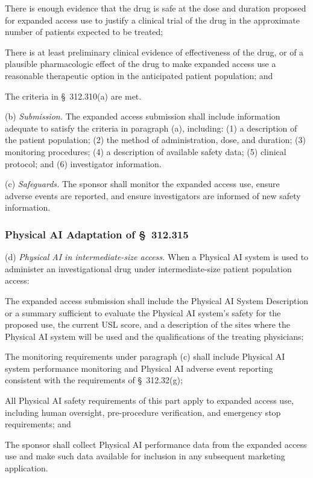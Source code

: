 \begin{description}[leftmargin=0.5cm,style=sameline]
\item[(1)] There is enough evidence that the drug is safe at the dose and duration proposed for expanded access use to justify a clinical trial of the drug in the approximate number of patients expected to be treated;
\item[(2)] There is at least preliminary clinical evidence of effectiveness of the drug, or of a plausible pharmacologic effect of the drug to make expanded access use a reasonable therapeutic option in the anticipated patient population; and
\item[(3)] The criteria in \S~312.310(a) are met.
\end{description}

(b) \textit{Submission.} The expanded access submission shall include information adequate to satisfy the criteria in paragraph (a), including: (1) a description of the patient population; (2) the method of administration, dose, and duration; (3) monitoring procedures; (4) a description of available safety data; (5) clinical protocol; and (6) investigator information.

(c) \textit{Safeguards.} The sponsor shall monitor the expanded access use, ensure adverse events are reported, and ensure investigators are informed of new safety information.

\subsubsection{Physical AI Adaptation of \S~312.315}

(d) \textit{Physical AI in intermediate-size access.} When a Physical AI system is used to administer an investigational drug under intermediate-size patient population access:

\begin{description}[leftmargin=0.8cm,style=sameline]
\item[(i)] The expanded access submission shall include the Physical AI System Description or a summary sufficient to evaluate the Physical AI system's safety for the proposed use, the current USL score, and a description of the sites where the Physical AI system will be used and the qualifications of the treating physicians;
\item[(ii)] The monitoring requirements under paragraph (c) shall include Physical AI system performance monitoring and Physical AI adverse event reporting consistent with the requirements of \S~312.32(g);
\item[(iii)] All Physical AI safety requirements of this part apply to expanded access use, including human oversight, pre-procedure verification, and emergency stop requirements; and
\item[(iv)] The sponsor shall collect Physical AI performance data from the expanded access use and make such data available for inclusion in any subsequent marketing application.
\end{description}

